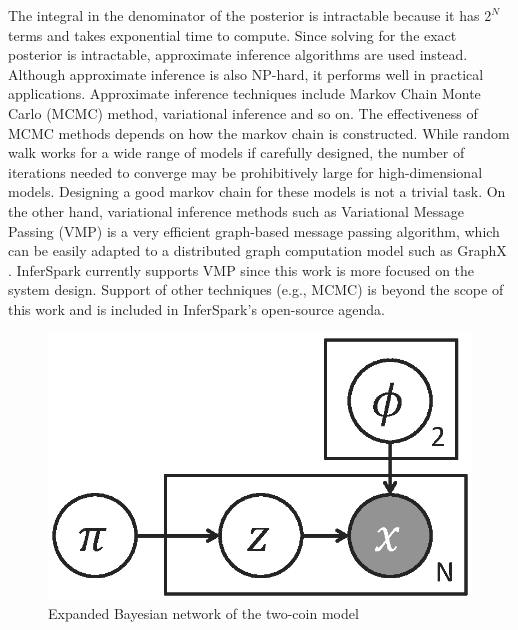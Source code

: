 The integral in the denominator of the posterior is intractable 
because it has $2^N$ terms and takes exponential time to compute.  
Since solving for the exact posterior is
intractable, approximate inference algorithms are used instead.
Although approximate inference is also NP-hard, it performs well in 
practical applications. 
Approximate inference techniques include Markov Chain Monte Carlo (MCMC) 
method, variational inference and so on.
The effectiveness of MCMC methods depends on how the markov chain is
constructed. While random walk works for a wide range of models if carefully
designed, the number of iterations needed to converge may be prohibitively
large for high-dimensional models. Designing a good markov chain for these
models is not a trivial task.
On the other hand, variational inference methods such as
Variational Message Passing (VMP) \cite{vmp}
is a very efficient graph-based message passing algorithm, 
which can be easily adapted to a distributed graph computation model such as
GraphX \cite{graphX}. 
InferSpark currently supports VMP since this work is more focused on the
system design.
Support of other techniques (e.g., MCMC) is beyond the scope of this work and
is included in InferSpark's open-source agenda.

\begin{figure}[ht]
	\centering
	\includegraphics[scale=0.4]{figs/two_coins_latent.eps}
	\caption{Expanded Bayesian network of the two-coin model}
	\label{fig:two_coin_bn}
\end{figure}


